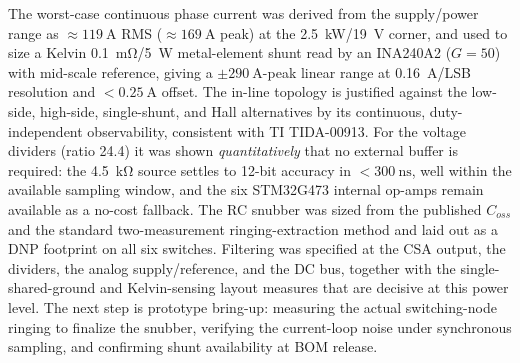 \documentclass[journal,onecolumn,11pt]{IEEEtran}
\begin{document}
The worst-case continuous phase current was derived from the supply/power range as
$\approx\SI{119}{\ampere}$ RMS ($\approx\SI{169}{\ampere}$ peak) at the \SI{2.5}{\kilo\watt}/\SI{19}{\volt}
corner, and used to size a Kelvin \SI{0.1}{\milli\ohm}/\SI{5}{\watt} metal-element shunt read by an
INA240A2 ($G{=}50$) with mid-scale reference, giving a $\pm\SI{290}{\ampere}$-peak linear range at
\SI{0.16}{\ampere/LSB} resolution and $<\SI{0.25}{\ampere}$ offset. The in-line topology is justified
against the low-side, high-side, single-shunt, and Hall alternatives by its continuous,
duty-independent observability, consistent with TI TIDA-00913. For the voltage dividers (ratio
\num{24.4}) it was shown \emph{quantitatively} that no external buffer is required: the
\SI{4.5}{\kilo\ohm} source settles to 12-bit accuracy in $<\SI{300}{\nano\second}$, well within the
available sampling window, and the six STM32G473 internal op-amps remain available as a no-cost
fallback. The RC snubber was sized from the published $C_{oss}$ and the standard two-measurement
ringing-extraction method and laid out as a DNP footprint on all six switches. Filtering was
specified at the CSA output, the dividers, the analog supply/reference, and the DC bus, together with
the single-shared-ground and Kelvin-sensing layout measures that are decisive at this power level.
The next step is prototype bring-up: measuring the actual switching-node ringing to finalize the
snubber, verifying the current-loop noise under synchronous sampling, and confirming shunt
availability at BOM release.
\end{document}
